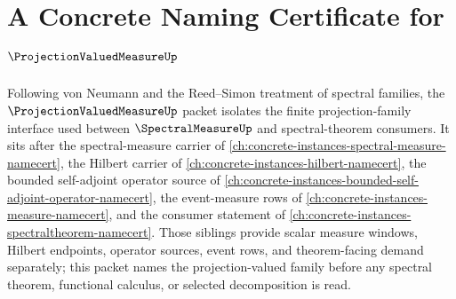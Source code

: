 \chapter{A Concrete Naming Certificate for $\ProjectionValuedMeasureUp$}
\label{ch:concrete-instances-projection-valued-measure-namecert}

Following von Neumann and the Reed--Simon treatment of spectral families, the $\ProjectionValuedMeasureUp$ packet isolates the finite projection-family interface used between $\SpectralMeasureUp$ and spectral-theorem consumers. It sits after the spectral-measure carrier of \autoref{ch:concrete-instances-spectral-measure-namecert}, the Hilbert carrier of \autoref{ch:concrete-instances-hilbert-namecert}, the bounded self-adjoint operator source of \autoref{ch:concrete-instances-bounded-self-adjoint-operator-namecert}, the event-measure rows of \autoref{ch:concrete-instances-measure-namecert}, and the consumer statement of \autoref{ch:concrete-instances-spectraltheorem-namecert}. Those siblings provide scalar measure windows, Hilbert endpoints, operator sources, event rows, and theorem-facing demand separately; this packet names the projection-valued family before any spectral theorem, functional calculus, or selected decomposition is read.

